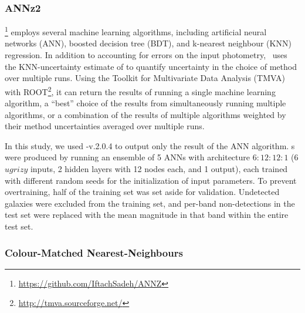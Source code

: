 \subsubsection{ANNz2}
\label{sec:annz2}

\annz \footnote{\url{https://github.com/IftachSadeh/ANNZ}} \citep{Sadeh:16} employs several machine learning algorithms, including artificial neural networks (ANN), boosted decision tree (BDT), and k-nearest neighbour (KNN) regression.
In addition to accounting for errors on the input photometry, \annz\ uses the KNN-uncertainty estimate of \citet{Oyaizu:08} to quantify uncertainty in the choice of method over multiple runs.
Using the Toolkit for Multivariate Data Analysis (TMVA) with ROOT\footnote{\url{http://tmva.sourceforge.net/}}, it can return the results of running a single machine learning algorithm, a ``best'' choice of the results from simultaneously running multiple algorithms, or a combination of the results of multiple algorithms weighted by their method uncertainties averaged over multiple runs.

In this study, we used \annz-v.2.0.4 to output only the result of the ANN algorithm.
\Pzpdf s were produced by running an ensemble of 5 ANNs with architecture $6:12:12:1$ (6 $ugrizy$ inputs, 2 hidden layers with 12 nodes each, and 1 output), each trained with different random seeds for the initialization of input parameters.
To prevent overtraining, half of the training set was set aside for validation.
Undetected galaxies were excluded from the training set, and per-band non-detections in the test set were replaced with the mean magnitude in that band within the entire test set.

\subsubsection{Colour-Matched Nearest-Neighbours}
\label{sec:cmnn}

